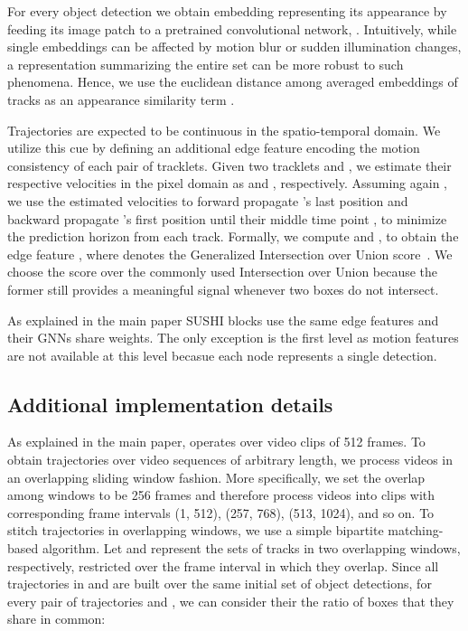 \documentclass[10pt,twocolumn,letterpaper]{article}
\begin{document}
{{ For every object detection  we obtain embedding  representing its appearance by feeding its image patch to a pretrained convolutional network, . Intuitively, while single embeddings can be affected by motion blur or sudden illumination changes, a representation summarizing the entire set can be more robust to such phenomena. Hence, we use the euclidean distance among averaged embeddings of tracks as an appearance similarity term   .


 Trajectories are expected to be continuous in the spatio-temporal domain. We utilize this cue  by defining an additional edge feature encoding the motion consistency of each pair of tracklets. Given two tracklets  and , we estimate their respective velocities in the pixel domain as  and , respectively. Assuming again , we use the estimated velocities to forward propagate 's last position and backward propagate 's first position until their middle time point , to minimize the prediction horizon from each track. Formally, we compute  and , to obtain the edge feature , where  denotes the Generalized Intersection over Union score~\cite{rezatofighi2019generalized}. We choose the  score over the commonly used Intersection over Union because the former still provides a meaningful signal whenever two boxes do not intersect.

As explained in the main paper SUSHI blocks use the same edge features and their GNNs share weights. The only exception is the first level as motion features are not available at this level becasue each node represents a single detection. 

\subsection{Additional implementation details}
 As explained in the main paper, \modelname operates over video clips of 512 frames. To obtain trajectories over video sequences of arbitrary length, we process videos in an overlapping sliding window fashion. More specifically, we set the overlap among windows to be 256 frames and therefore process videos into clips with corresponding frame intervals (1, 512), (257, 768), (513, 1024), and so on. To stitch trajectories in overlapping windows, we use a simple bipartite matching-based algorithm. Let  and   represent the sets of tracks in two overlapping windows, respectively, restricted over the frame interval in which they overlap. Since all trajectories in  and  are built over the same initial set of object detections, for every pair of trajectories  and , we can consider their  \ie the ratio of boxes that they share in common:

}}
\end{document}
